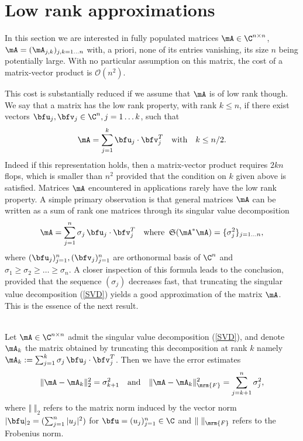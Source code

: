 


\section{Low rank approximations}
\label{sec:LowRankApprox}

In this section we are interested in fully populated matrices $\mA\in \C^{n\times n}$, $\mA = (\mA_{j,k})_{j,k=1\dots n}$ with, a priori, 
none of its entries vanishing, its size $n$ being potentially large. With no particular assumption on this matrix, the cost of a 
matrix-vector product is $\mathcal{O}(n^{2})$. 

\bigskip
This cost is substantially reduced if we assume that $\mA$ is of low rank though. We say that a matrix has the low rank property, 
with rank $k\leq n$, if there exist vectors $\bfu_{j},\bfv_{j}\in \C^{n}, j=1\dots k$, such that 
\[
\mA = \sum_{j=1}^{k}\bfu_{j}\cdot\bfv_{j}^{T}\quad \textrm{with}\quad k\leq n/2.
\]
Indeed if this representation holds, then a matrix-vector product requires $2 k n$ flops, which is smaller than $n^{2}$ provided 
that the condition on $k$ given above is satisfied. Matrices $\mA$ encountered in applications rarely have the low rank property. 
A simple primary observation is that general matrices $\mA$ can be written as a sum of rank one matrices through its singular value
decomposition
\begin{equation}\label{SVD}
\mA = \sum_{j=1}^{n}\sigma_{j}\,\bfu_{j}\cdot\bfv_{j}^{T}\quad \textrm{where}\;\; \mathfrak{S}(\mA^{*}\mA) = \{\sigma_{j}^{2}\}_{j=1\dots n},
\end{equation}
where $(\bfu_{j})_{j=1}^{n}, (\bfv_{j})_{j=1}^{n}$ are orthonormal basis of $\C^{n}$ and $\sigma_{1}\geq \sigma_{2}\geq \dots \geq \sigma_{n}$. 
A closer inspection of this formula leads to the conclusion, provided that the sequence $(\sigma_{j})$  decreases fast, that 
truncating the singular value decomposition (\ref{SVD}) yields a good approximation of the matrix $\mA$. This is the essence of 
the next result.

\begin{proposition}\quad\\
Let $\mA\in \C^{n\times n}$ admit the singular value decomposition (\ref{SVD}), and denote $\mA_{k}$ the 
matrix obtained by truncating this decomposition at rank $k$ namely $\mA_{k}:=\sum_{j=1}^{k}\sigma_{j}\,\bfu_{j}
\cdot\bfv_{j}^{T}$. Then we have the error estimates
\[
\Vert \mA - \mA_{k}\Vert_{2}^{2} = \sigma_{k+1}^{2}
\quad\textrm{and}\quad 
\Vert \mA - \mA_{k}\Vert_{\mrm{F}}^{2} = \sum_{j=k+1}^{n}\sigma_{j}^{2},
\]
where $\Vert \;\Vert_{2}$ refers to the matrix norm induced by the vector norm $\vert \bfu\vert_{2} = (\sum_{j=1}^{n}\vert u_{j}\vert^{2})$ 
for $\bfu = (u_{j})_{j=1}^{n}\in \C$ and $\Vert \;\Vert_{\mrm{F}}$ refers to the Frobenius norm.
\end{proposition}

